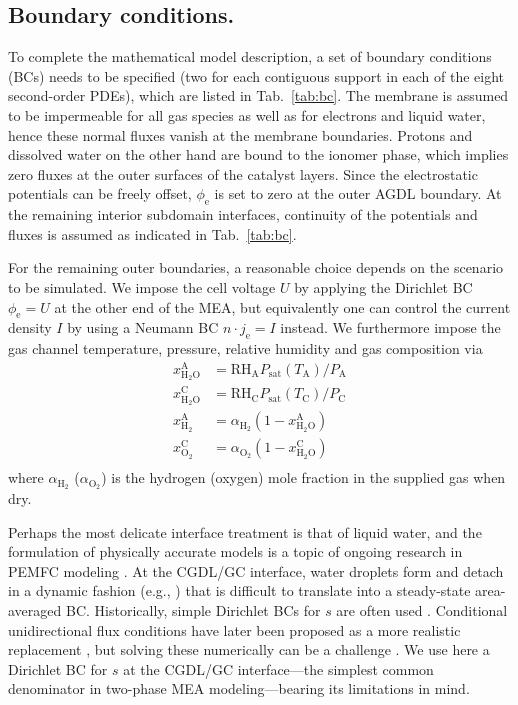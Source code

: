 \documentclass[fontsize=9pt,DIV=calc,a4paper,twocolumn]{scrartcl}
\begin{document}
\subsection*{Boundary conditions.}

To complete the mathematical model description, a set of boundary conditions (BCs) needs to be specified (two for each contiguous support in each of the eight second-order PDEs), which are listed in Tab.~\ref{tab:bc}. The membrane is assumed to be impermeable for all gas species as well as for electrons and liquid water, hence these normal fluxes vanish at the membrane boundaries. Protons and dissolved water on the other hand are bound to the ionomer phase, which implies zero fluxes at the outer surfaces of the catalyst layers. Since the electrostatic potentials can be freely offset, $\phi_\mathrm{e}$ is set to zero at the outer AGDL boundary. At the remaining interior subdomain interfaces, continuity of the potentials and fluxes is assumed as indicated in Tab.~\ref{tab:bc}.

For the remaining outer boundaries, a reasonable choice depends on the scenario to be simulated. We impose the cell voltage $U$ by applying the Dirichlet BC $\phi_\mathrm{e}=U$ at the other end of the MEA, but equivalently one can control the current density $I$ by using a Neumann BC $n\cdot j_\mathrm{e}=I$ instead. We furthermore impose the gas channel temperature, pressure, relative humidity and gas composition via
%
\begin{equation}
\begin{aligned}
x_{\mathrm{H}_2\mathrm{O}}^\mathrm{A} &= \mathrm{RH}_\mathrm{A}P_\mathrm{sat}(T_\mathrm{A})/P_\mathrm{A}\\
x_{\mathrm{H}_2\mathrm{O}}^\mathrm{C} &= \mathrm{RH}_\mathrm{C}P_\mathrm{sat}(T_\mathrm{C})/P_\mathrm{C}\\
x_{\mathrm{H}_2}^\mathrm{A} &= \alpha_{\mathrm{H}_2}(1-x_{\mathrm{H}_2\mathrm{O}}^\mathrm{A})\\
x_{\mathrm{O}_2}^\mathrm{C} &= \alpha_{\mathrm{O}_2}(1-x_{\mathrm{H}_2\mathrm{O}}^\mathrm{C})\\
\end{aligned}
\end{equation}
%
where $\alpha_{\mathrm{H}_2}$ ($\alpha_{\mathrm{O}_2}$) is the hydrogen (oxygen) mole fraction in the supplied gas when dry. 

Perhaps the most delicate interface treatment is that of liquid water, and the formulation of physically accurate models is a topic of ongoing research in PEMFC modeling \cite{weber:14}. At the CGDL/GC interface, water droplets form and detach in a dynamic fashion (e.g., \cite{yang:04,schillberg:07}) that is difficult to translate into a steady-state area-averaged BC. Historically, simple Dirichlet BCs for $s$ are often used \cite{natarajan:01,nam:03,lin:04}. Conditional unidirectional flux conditions have later been proposed as a more realistic replacement \cite{weber:06,gerteisen:09}, but solving these numerically can be a challenge \cite{zhou:17}. We use here a Dirichlet BC for $s$ at the CGDL/GC interface---the simplest common denominator in two-phase MEA modeling---bearing its limitations in mind.
\end{document}
